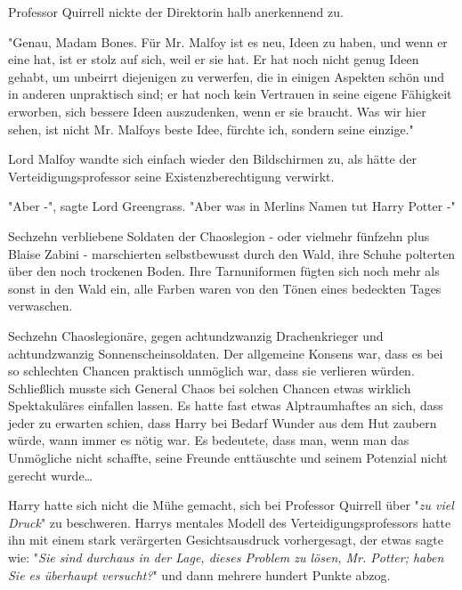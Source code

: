 {Professor Quirrell nickte der Direktorin halb anerkennend zu.

"Genau, Madam Bones. Für Mr. Malfoy ist es neu, Ideen zu haben, und wenn er eine hat, ist er stolz auf sich, weil er sie hat. Er hat noch nicht genug Ideen gehabt, um unbeirrt diejenigen zu verwerfen, die in einigen Aspekten schön und in anderen unpraktisch sind; er hat noch kein Vertrauen in seine eigene Fähigkeit erworben, sich bessere Ideen auszudenken, wenn er sie braucht. Was wir hier sehen, ist nicht Mr. Malfoys beste Idee, fürchte ich, sondern seine einzige."

Lord Malfoy wandte sich einfach wieder den Bildschirmen zu, als hätte der Verteidigungsprofessor seine Existenzberechtigung verwirkt.

"Aber -", sagte Lord Greengrass. "Aber was in Merlins Namen tut Harry Potter -"

Sechzehn verbliebene Soldaten der Chaoslegion - oder vielmehr fünfzehn plus Blaise Zabini - marschierten selbstbewusst durch den Wald, ihre Schuhe polterten über den noch trockenen Boden. Ihre Tarnuniformen fügten sich noch mehr als sonst in den Wald ein, alle Farben waren von den Tönen eines bedeckten Tages verwaschen.

Sechzehn Chaoslegionäre, gegen achtundzwanzig Drachenkrieger und achtundzwanzig Sonnenscheinsoldaten. Der allgemeine Konsens war, dass es bei so schlechten Chancen praktisch unmöglich war, dass sie verlieren würden. Schließlich musste sich General Chaos bei solchen Chancen etwas wirklich Spektakuläres einfallen lassen. Es hatte fast etwas Alptraumhaftes an sich, dass jeder zu erwarten schien, dass Harry bei Bedarf Wunder aus dem Hut zaubern würde, wann immer es nötig war. Es bedeutete, dass man, wenn man das Unmögliche nicht schaffte, seine Freunde enttäuschte und seinem Potenzial nicht gerecht wurde…

Harry hatte sich nicht die Mühe gemacht, sich bei Professor Quirrell über "\emph{zu viel Druck}" zu beschweren. Harrys mentales Modell des Verteidigungsprofessors hatte ihn mit einem stark verärgerten Gesichtsausdruck vorhergesagt, der etwas sagte wie: "\emph{Sie sind durchaus in der Lage, dieses Problem zu lösen, Mr. Potter; haben Sie es überhaupt versucht?}" und dann mehrere hundert Punkte abzog.

}
